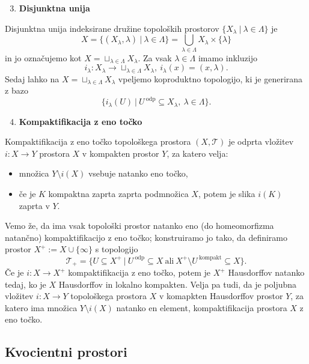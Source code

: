 \documentclass[10pt, a4paper]{article}
\begin{document}
\begin{enumerate}
  \setcounter{enumi}{2}
  \item \textbf{Disjunktna unija}
\end{enumerate}

Disjunktna unija indeksirane družine topoloških prostorov $\{X_\lambda \ |\ \lambda \in \Lambda\}$ je
$$X = \{(X_\lambda, \lambda)\ |\ \lambda \in \Lambda\} = \bigcup_{\lambda \in \Lambda} X_\lambda \times \{\lambda\}$$
in jo označujemo kot $X = \sqcup_{\lambda \in \Lambda} X_\lambda$.
Za vsak $\lambda \in \Lambda$ imamo inkluzijo 
$$i_\lambda: X_\lambda \to \sqcup_{\lambda \in \Lambda} X_\lambda,\ i_\lambda (x) = (x, \lambda).$$
Sedaj lahko na $X = \sqcup_{\lambda \in \Lambda} X_\lambda$ vpeljemo koproduktno topologijo,
ki je generirana z bazo 
$$\{i_\lambda (U)\ |\ U^{\ \text{odp}} \subseteq X_\lambda,\ \lambda \in \Lambda\}.$$

\begin{enumerate}
  \setcounter{enumi}{3}
  \item \textbf{Kompaktifikacija z eno točko}
\end{enumerate}

Kompaktifikacija z eno točko topološkega prostora $(X, \mathcal{T})$ je odprta vložitev 
$i: X \to Y$ prostora $X$ v kompakten prostor $Y$, za katero velja:
\begin{itemize}
  \item množica $Y \setminus i(X)$ vsebuje natanko eno točko,
  \item če je $K$ kompaktna zaprta zaprta podmnožica $X$, potem je slika $i(K)$ zaprta v $Y$.
\end{itemize}
Vemo že, da ima vsak topološki prostor natanko eno (do homeomorfizma natančno)
kompaktifikacijo z eno točko; konstruiramo jo tako, da definiramo prostor $X^+ := X \cup \{\infty\}$
s topologijo 
$$\mathcal{T_+} = \{U \subseteq X^+\ |\ U^{\ \text{odp}} \subseteq X\ \mathrm{ali}\ X^+ \setminus U ^{\ \text{kompakt}} \subseteq X \}.$$
Če je $i: X \to X^+$ kompaktifikacija z eno točko,
potem je $X^+$ Hausdorffov natanko tedaj, ko je $X$ Hausdorffov in lokalno kompakten.
Velja pa tudi, da je poljubna vložitev $i: X \to Y$
topološkega prostora $X$ v komapkten Hausdorffov prostor $Y$,
za katero ima množica $Y \setminus i(X)$ natanko en element,
kompaktifikacija prostora $X$ z eno točko.

\subsection{Kvocientni prostori}
\end{document}
